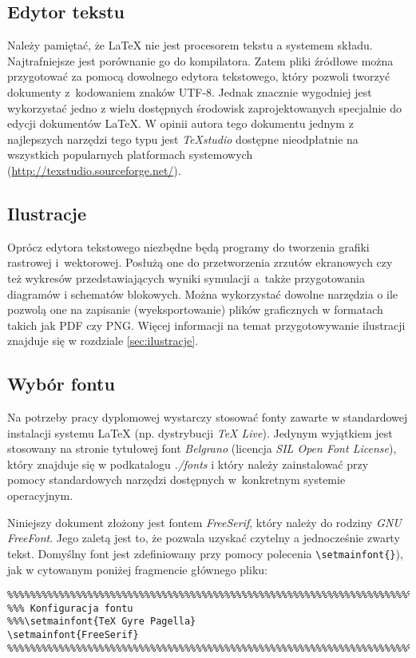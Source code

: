 \subsection{Edytor tekstu}
Należy pamiętać, że {\LaTeX} nie jest procesorem tekstu a systemem składu. Najtrafniejsze jest porównanie go do kompilatora. Zatem pliki źródłowe można przygotować  za pomocą dowolnego edytora tekstowego, który pozwoli tworzyć dokumenty z~kodowaniem znaków UTF-8. Jednak znacznie wygodniej jest wykorzystać jedno z wielu dostępnych środowisk zaprojektowanych specjalnie do edycji dokumentów  {\LaTeX}. W opinii autora tego dokumentu jednym z najlepszych narzędzi tego typu jest  \textit{TeXstudio} dostępne nieodpłatnie na wszystkich popularnych platformach systemowych (\url{http://texstudio.sourceforge.net/}).

\subsection{Ilustracje}
Oprócz edytora tekstowego niezbędne będą programy do tworzenia grafiki rastrowej i~wektorowej. Posłużą one do przetworzenia zrzutów ekranowych czy też wykresów przedstawiających wyniki symulacji a~także przygotowania diagramów i schematów blokowych. Można wykorzystać dowolne narzędzia o ile pozwolą one na zapisanie (wyeksportowanie) plików graficznych w formatach takich jak PDF czy PNG. Więcej informacji na temat przygotowywanie ilustracji znajduje się w rozdziale \ref{sec:ilustracje}.
 
\subsection{Wybór fontu}
Na potrzeby pracy dyplomowej  wystarczy stosować fonty zawarte w standardowej instalacji systemu {\LaTeX} (np. dystrybucji \textit{TeX Live}). Jedynym wyjątkiem jest  stosowany na stronie tytułowej font \textit{Belgrano} (licencja \textit{SIL Open Font License}), który znajduje się w podkatalogu \textit{./fonts} i który należy zainstalować  przy pomocy standardowych narzędzi dostępnych w~konkretnym systemie operacyjnym.

Niniejszy dokument złożony jest fontem \textit{FreeSerif}, który należy do rodziny \textit{GNU FreeFont}. Jego zaletą jest to, że pozwala uzyskać czytelny a jednocześnie zwarty tekst. Domyślny font jest zdefiniowany przy pomocy polecenia \texttt{\textbackslash setmainfont\{\}}), jak w cytowanym poniżej fragmencie głównego pliku:

{\footnotesize \begin{verbatim}
%%%%%%%%%%%%%%%%%%%%%%%%%%%%%%%%%%%%%%%%%%%%%%%%%%%%%%%%%%%%%%%%%%%%%%%%%%%%%%%%%%%%%%%%%
%%% Konfiguracja fontu
%%%\setmainfont{TeX Gyre Pagella}
\setmainfont{FreeSerif}
%%%%%%%%%%%%%%%%%%%%%%%%%%%%%%%%%%%%%%%%%%%%%%%%%%%%%%%%%%%%%%%%%%%%%%%%%%%%%%%%%%%%%%%%%
\end{verbatim}
}

